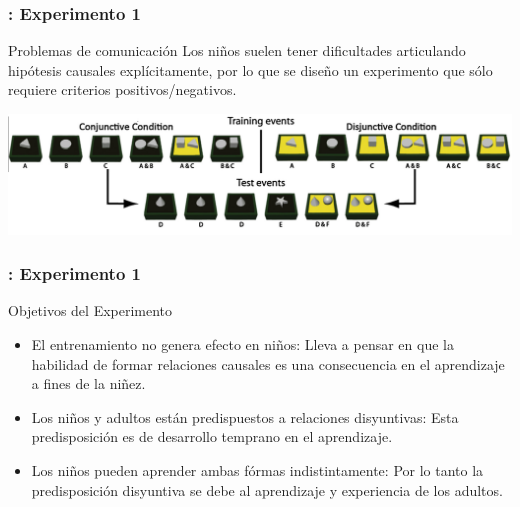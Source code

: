 
\begin{frame}[fragile]
  \frametitle{\shortt:  Experimento 1}
    \begin{block}{Problemas de comunicación}
        Los niños suelen tener dificultades articulando hipótesis causales explícitamente, por lo que se diseño un experimento que sólo requiere criterios positivos/negativos.
    \end{block}
    \begin{center}
    \includegraphics[scale=0.25]{images/experiment1.png}
    \end{center}
\end{frame}

\begin{frame}[fragile]
  \frametitle{\shortt: Experimento 1}
    \begin{block}{Objetivos del Experimento}
    \begin{itemize}
    \item El entrenamiento no genera efecto en niños: Lleva a pensar en que la habilidad de formar relaciones causales es una consecuencia en el aprendizaje a fines de la niñez.
    \item Los niños y adultos están predispuestos a relaciones disyuntivas:  Esta predisposición es de desarrollo temprano en el aprendizaje.
    \item Los niños pueden aprender ambas fórmas indistintamente: Por lo tanto la predisposición disyuntiva se debe al aprendizaje y experiencia de los adultos.
    \end{itemize}
    \end{block}
\end{frame}


